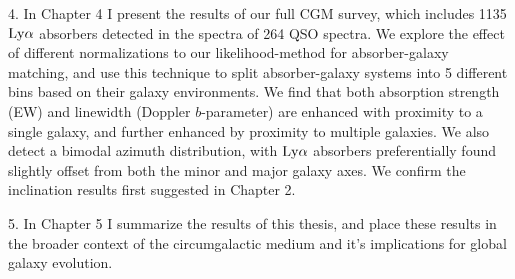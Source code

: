 \documentclass[twocolumn,tighten]{aastex62}
\begin{document}
4. In Chapter 4 I present the results of our full CGM survey, which includes 1135 $\rm Ly\alpha$ absorbers detected in the spectra of 264 QSO spectra. We explore the effect of different normalizations to our likelihood-method for absorber-galaxy matching, and use this technique to split absorber-galaxy systems into 5 different bins based on their galaxy environments. We find that both absorption strength (EW) and linewidth (Doppler $b$-parameter) are enhanced with proximity to a single galaxy, and further enhanced by proximity to multiple galaxies. We also detect a bimodal azimuth distribution, with $\rm Ly\alpha$ absorbers preferentially found slightly offset from both the minor and major galaxy axes. We confirm the inclination results first suggested in Chapter 2.

5. In Chapter 5 I summarize the results of this thesis, and place these results in the broader context of the circumgalactic medium and it's implications for global galaxy evolution.



%
{}


\clearpage
\end{document}
